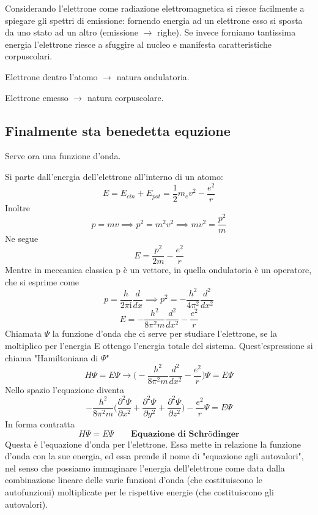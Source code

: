 Considerando l'elettrone come radiazione elettromagnetica si riesce facilmente a spiegare gli spettri di emissione: fornendo energia ad un elettrone esso si sposta da uno stato ad un altro (emissione $\rightarrow$ righe). Se invece forniamo tantissima energia l'elettrone riesce a sfuggire al nucleo e manifesta caratteristiche corpuscolari.

Elettrone dentro l'atomo $\rightarrow$ natura ondulatoria.

Elettrone emesso $\rightarrow$ natura corpuscolare.
\subsection{Finalmente sta benedetta equzione}
Serve ora una funzione d'onda.

Si parte dall'energia dell'elettrone all'interno di un atomo:
$$E=E_{cin} + E_{pot}=\frac{1}{2}m_ev^2 - \frac{e^2}{r}$$
Inoltre
$$p=mv \implies p^2=m^2v^2 \implies mv^2=\frac{p^2}{m}$$
Ne segue
$$E=\frac{p^2}{2m} - \frac{e^2}{r}$$
Mentre in meccanica classica p è un vettore, in quella ondulatoria è un operatore, che si esprime come
$$p=\frac{h}{2\pi \text{i}}\frac{d}{dx}\implies p^2=-\frac{h^2}{4\pi^2}\frac{d^2}{dx^2}$$
$$E=-\frac{h^2}{8\pi^2m}\frac{d^2}{dx^2} -\frac{e^2}{r}$$
Chiamata $\Psi$ la funzione d'onda che ci serve per studiare l'elettrone, se la moltiplico per l'energia E ottengo l'energia totale del sistema. Quest'espressione si chiama "Hamiltoniana di $\Psi$"
$$H\Psi=E\Psi \rightarrow \biggl(-\frac{h^2}{8\pi^2m}\frac{d^2}{dx^2} -\frac{e^2}{r}\biggr)\Psi=E\Psi$$
Nello spazio l'equazione diventa
$$-\frac{h^2}{8\pi^2m}\biggl( \frac{\partial^2\Psi}{\partial x^2}+\frac{\partial^2\Psi}{\partial y^2}+\frac{\partial^2\Psi}{\partial z^2}\biggr) -\frac{e^2}{r}\Psi =E\Psi$$
In forma contratta
$$H\Psi=E\Psi \qquad \textbf{Equazione di Schrödinger}$$
Questa è l'equazione d'onda per l'elettrone. Essa mette in relazione la funzione d'onda con la sue energia, ed essa prende il nome di "equazione agli autovalori", nel senso che possiamo immaginare l'energia dell'elettrone come data dalla combinazione lineare delle varie funzioni d'onda (che costituiscono le autofunzioni) moltiplicate per le rispettive energie (che costituiscono gli autovalori).

